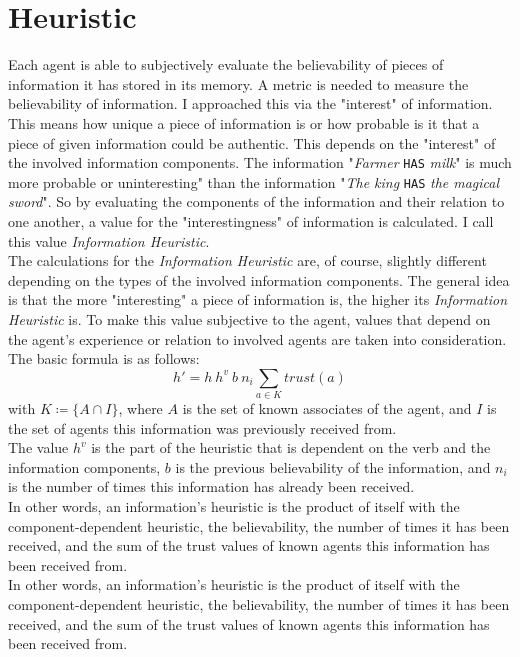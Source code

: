 \section{Heuristic}
\label{section:heuristic}
Each agent is able to subjectively evaluate the believability of pieces of information it has stored in its memory. A metric is needed to measure the believability of information. I approached this via the "interest" of information. This means how unique a piece of information is or how probable is it that a piece of given information could be authentic. This depends on the "interest" of the involved information components. The information "\textit{Farmer} \verb|HAS| \textit{milk}" is much more probable or uninteresting" than the information "\textit{The king} \verb|HAS| \textit{the magical sword}". So by evaluating the components of the information and their relation to one another, a value for the "interestingness" of information is calculated. I call this value \textit{Information Heuristic}.\\
The calculations for the \textit{Information Heuristic} are, of course, slightly different depending on the types of the involved information components. The general idea is that the more "interesting" a piece of information is, the higher its \textit{Information Heuristic} is. To make this value subjective to the agent, values that depend on the agent's experience or relation to involved agents are taken into consideration.\\
The basic formula is as follows:
\begin{equation}
	h' = h\ h^{v}\ b\ n_i\sum_{a \in K}trust(a)
\end{equation}
with $K \coloneqq \{A \cap I\}$, where $A$ is the set of known associates of the agent, and $I$ is the set of agents this information was previously received from.\\
The value $h^{v}$ is the part of the heuristic that is dependent on the verb and the information components, $b$ is the previous believability of the information, and $n_i$ is the number of times this information has already been received.\\
In other words, an information's heuristic is the product of itself with the component-dependent heuristic, the believability, the number of times it has been received, and the sum of the trust values of known agents this information has been received from. \\
In other words, an information’s heuristic is the product of itself with the component-dependent heuristic, the believability, the number of times it has been received, and the sum of the trust values of known agents this information has been received from.\\
